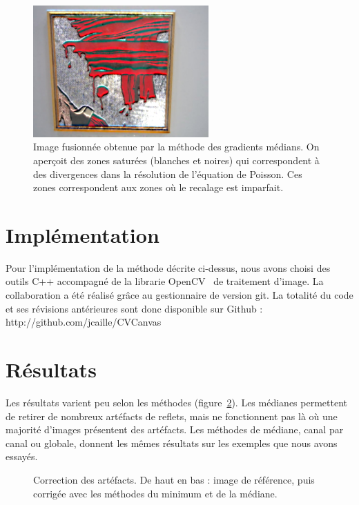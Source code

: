 \documentclass[12pt,a4paper]{article}
\begin{document}
\begin{figure}
\includegraphics[width=0.6\textwidth]{Fig/poisson.png}
\caption{Image fusionnée obtenue par la méthode des gradients médians. On aperçoit des zones saturées (blanches et noires) qui correspondent à des divergences dans la résolution de l'équation de Poisson. Ces zones correspondent aux zones où le recalage est imparfait.}
\label{poissonfig}
\end{figure}
\section{Implémentation}

Pour l'implémentation de la méthode décrite ci-dessus, nous avons choisi des outils C++ accompagné de la librarie OpenCV~\citep{opencv_library} de traitement d'image. La collaboration a été réalisé grâce au gestionnaire de version git. La totalité du code et ses révisions antérieures sont donc disponible sur Github : http://github.com/jcaille/CVCanvas

\section{Résultats}
\label{results}
Les résultats varient peu selon les méthodes (figure~\ref{mediane}). Les médianes permettent de retirer de nombreux artéfacts de reflets, mais ne fonctionnent pas là où une majorité d'images présentent des artéfacts. Les méthodes de médiane, canal par canal ou globale, donnent les mêmes résultats sur les exemples que nous avons essayés.
\begin{figure}
\centering
\begin{minipage}{0.6\linewidth}
\end{minipage}
\begin{minipage}{0.6\linewidth}
\end{minipage}
\begin{minipage}{0.6\linewidth}
\end{minipage}
\caption{Correction des artéfacts. De haut en bas : image de référence, puis corrigée avec les méthodes du minimum et de la médiane.}
\label{mediane}
\end{figure} 
\end{document}
